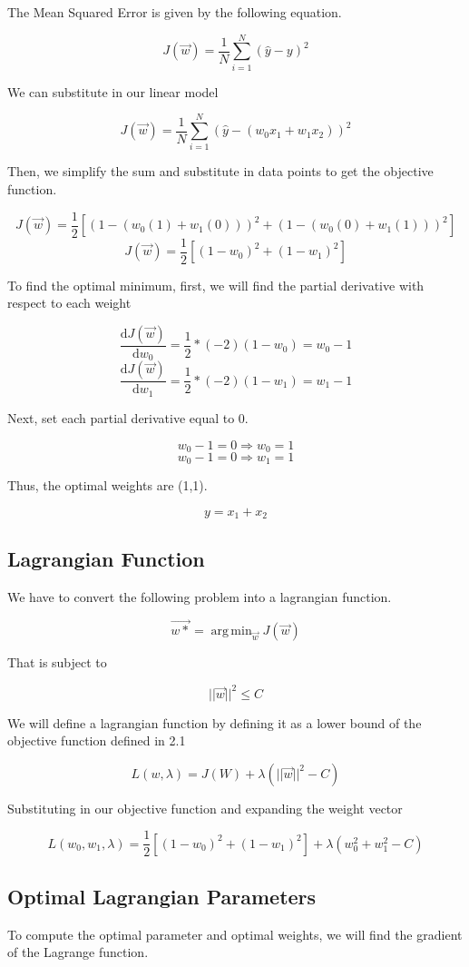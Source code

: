 \documentclass{article}
\DeclareMathOperator*{\argminA}{arg\,min}
\begin{document}
The Mean Squared Error is given by the following equation.

\[J(\Vec{w}) = \frac{1}{N} \sum^N_{i=1}(\hat{y} - y)^2\]

We can substitute in our linear model

\[J(\Vec{w}) = \frac{1}{N} \sum^N_{i=1}(\hat{y} - (w_0x_1 + w_1x_2))^2\]

Then, we simplify the sum and substitute in data points to get the objective function.

\[J(\Vec{w}) = \frac{1}{2} [(1 - (w_0(1) + w_1(0)))^2 + (1 - (w_0(0) + w_1(1)))^2]    \]
\[J(\Vec{w}) = \frac{1}{2} [(1 - w_0)^2 + (1 - w_1)^2]    \]

To find the optimal minimum, first, we will find the partial derivative with respect to each weight

\[\frac{\mathrm{d}J(\Vec{w})}{\mathrm{d}w_0} = \frac{1}{2} * (-2) (1 - w_0) = w_0 - 1 \]
\[\frac{\mathrm{d}J(\Vec{w})}{\mathrm{d}w_1} = \frac{1}{2} * (-2) (1 - w_1) = w_1 - 1 \]

Next, set each partial derivative equal to 0.

\[w_0 - 1 = 0 \Rightarrow w_0 = 1\]
\[w_0 - 1 = 0 \Rightarrow w_1 = 1\]

Thus, the optimal weights are (1,1).

\[y = x_1 + x_2\]

\subsection{Lagrangian Function}

We have to convert the following problem into a lagrangian function.

\[\Vec{w*} = \argminA_{\Vec{w}} J(\Vec{w})\]

That is subject to

\[||\Vec{w}||^2 \leq C\]

We will define a lagrangian function by defining it as a lower bound of the objective function defined in 2.1

\[L(w, \lambda) = J(W) + \lambda( ||\Vec{w}||^2 - C )\]

Substituting in our objective function and expanding the weight vector

\[L(w_0, w_1, \lambda) = \frac{1}{2} [(1 - w_0)^2 + (1 - w_1)^2]  + \lambda( w_0^2 + w_1^2 - C )\]

\subsection{Optimal Lagrangian Parameters}
To compute the optimal parameter and optimal weights, we will find the gradient of the Lagrange function.
\end{document}
